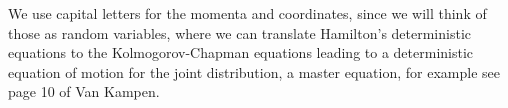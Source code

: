 We use capital letters for the momenta and coordinates, since we will think of those as random variables, where we can translate Hamilton's deterministic equations to the Kolmogorov-Chapman equations leading to a deterministic equation of motion for the joint distribution, a master equation, for example see page 10 of Van Kampen\cite{vankampen}. 